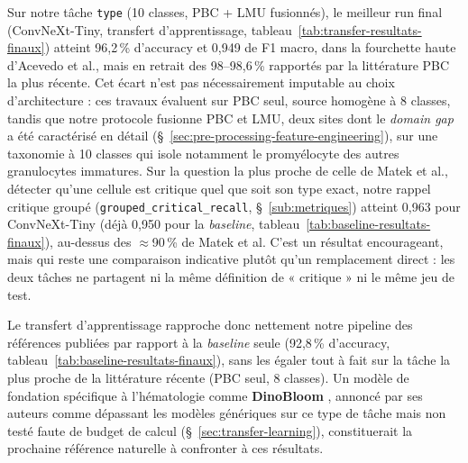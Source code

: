 Sur notre tâche \texttt{type} (10 classes, PBC + LMU fusionnés), le meilleur run final (ConvNeXt-Tiny, transfert d'apprentissage, tableau~\ref{tab:transfer-resultats-finaux}) atteint 96,2\,\% d'accuracy et 0,949 de F1 macro, dans la fourchette haute d'Acevedo et al., mais en retrait des 98--98,6\,\% rapportés par la littérature PBC la plus récente.
Cet écart n'est pas nécessairement imputable au choix d'architecture : ces travaux évaluent sur PBC seul, source homogène à 8 classes, tandis que notre protocole fusionne PBC et LMU, deux sites dont le \emph{domain gap} a été caractérisé en détail (\S~\ref{sec:pre-processing-feature-engineering}), sur une taxonomie à 10 classes qui isole notamment le promyélocyte des autres granulocytes immatures.
Sur la question la plus proche de celle de Matek et al., détecter qu'une cellule est critique quel que soit son type exact, notre rappel critique groupé (\texttt{grouped\_critical\_recall}, \S~\ref{sub:metriques}) atteint 0,963 pour ConvNeXt-Tiny (déjà 0,950 pour la \emph{baseline}, tableau~\ref{tab:baseline-resultats-finaux}), au-dessus des $\approx$90\,\% de Matek et al. C'est un résultat encourageant, mais qui reste une comparaison indicative plutôt qu'un remplacement direct : les deux tâches ne partagent ni la même définition de « critique » ni le même jeu de test.

Le transfert d'apprentissage rapproche donc nettement notre pipeline des références publiées par rapport à la \emph{baseline} seule (92,8\,\% d'accuracy, tableau~\ref{tab:baseline-resultats-finaux}), sans les égaler tout à fait sur la tâche la plus proche de la littérature récente (PBC seul, 8 classes).
Un modèle de fondation spécifique à l'hématologie comme \textbf{DinoBloom} \parencite{koch2024dinobloom}, annoncé par ses auteurs comme dépassant les modèles génériques sur ce type de tâche mais non testé faute de budget de calcul (\S~\ref{sec:transfer-learning}), constituerait la prochaine référence naturelle à confronter à ces résultats.
